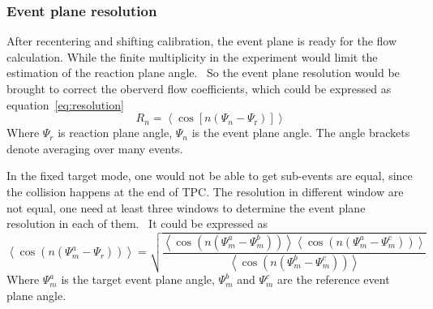 \subsubsection{Event plane resolution}
After recentering and shifting calibration, the event plane is ready for the flow calculation. 
While the finite multiplicity in the experiment would limit the estimation of the reaction plane angle.~\cite{voloshin2008collective}
So the event plane resolution would be brought to correct the oberverd flow coefficients, which could be expressed as equation~\ref{eq:resolution}
\begin{equation}
R_n=\left\langle\cos \left[n\left(\Psi_n-\Psi_{\mathrm{r}}\right)\right]\right\rangle
\label{eq:resolution}
\end{equation}
Where $\Psi_r$ is reaction plane angle, $\Psi_n$ is the event plane angle.
The angle brackets denote averaging over many events. 

In the fixed target mode, one would not be able to get sub-events are equal, since the collision happens at 
the end of TPC. The resolution in different window are not equal, one need at least three windows to determine
the event plane resolution in each of them.~\cite{poskanzer1998methods} It could be expressed as
\begin{equation}
    \left\langle\cos \left(n\left(\Psi_m^a-\Psi_r\right)\right)\right\rangle=\sqrt{\frac{\left\langle\cos \left(n\left(\Psi_m^a-\Psi_m^b\right)\right)\right\rangle\left\langle\cos \left(n\left(\Psi_m^a-\Psi_m^c\right)\right)\right\rangle}{\left\langle\cos \left(n\left(\Psi_m^b-\Psi_m^c\right)\right)\right\rangle}}
\label{eq:threeSub_res}
\end{equation}
Where $\Psi_m^a$ is the target event plane angle,  $\Psi_m^b$ and  $\Psi_m^c$ are the reference event plane angle.

